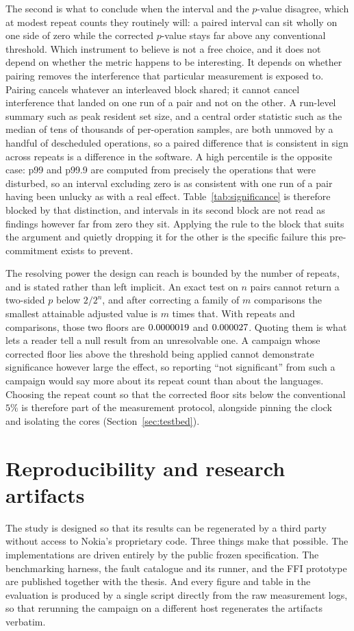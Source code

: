 \documentclass[english,twoside,openright,a4paper,censored,csm,software-track-2020]{HYthesisML}
\begin{document}
The second is what to conclude when the interval and the $p$-value disagree, which at modest
repeat counts they routinely will: a paired interval can sit wholly on one side of zero while
the corrected $p$-value stays far above any conventional threshold. Which instrument to believe
is not a free choice, and it does not depend on whether the metric happens to be interesting. It
depends on whether pairing removes the interference that particular measurement is exposed to.
Pairing cancels whatever an interleaved block shared; it cannot cancel interference that landed
on one run of a pair and not on the other. A run-level summary such as peak resident set size,
and a central order statistic such as the median of tens of thousands of per-operation samples,
are both unmoved by a handful of descheduled operations, so a paired difference that is
consistent in sign across repeats is a difference in the software. A high percentile is the
opposite case: p99 and p99.9 are computed from precisely the operations that were disturbed, so
an interval excluding zero is as consistent with one run of a pair having been unlucky as with a
real effect. Table~\ref{tab:significance} is therefore blocked by that distinction, and
intervals in its second block are not read as findings however far from zero they sit. Applying
the rule to the block that suits the argument and quietly dropping it for the other is the
specific failure this pre-commitment exists to prevent.

The resolving power the design can reach is bounded by the number of repeats, and is stated
rather than left implicit. An exact test on $n$ pairs cannot return a two-sided $p$ below
$2/2^{n}$, and after correcting a family of $m$ comparisons the smallest attainable adjusted
value is $m$ times that. With \NRepeats{} repeats and \NTests{} comparisons, those two floors
are $0.0000019$ and $0.000027$. Quoting them is what lets a reader tell a null
result from an unresolvable one. A campaign whose corrected floor lies above the threshold being
applied cannot demonstrate significance however large the effect, so reporting ``not
significant'' from such a campaign would say more about its repeat count than about the
languages. Choosing the repeat count so that the corrected floor sits below the conventional
$5\%$ is therefore part of the measurement protocol, alongside pinning the clock and isolating
the cores (Section~\ref{sec:testbed}).

\section{Reproducibility and research artifacts}\label{sec:repro}
The study is designed so that its results can be regenerated by a third party without access to
Nokia's proprietary code. Three things make that possible. The implementations are driven
entirely by the public frozen specification. The benchmarking harness, the fault catalogue and
its runner, and the FFI prototype are published together with the thesis. And every figure and
table in the evaluation is produced by a single script directly from the raw measurement logs,
so that rerunning the campaign on a different host regenerates the artifacts verbatim.
\end{document}
